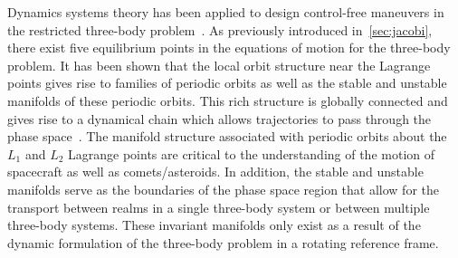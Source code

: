 \documentclass[preprint]{elsarticle}
\begin{document}
Dynamics systems theory has been applied to design control-free maneuvers in the restricted three-body problem~\cite{koon2011}.
As previously introduced in~\cref{sec:jacobi}, there exist five equilibrium points in the equations of motion for the three-body problem.
It has been shown that the local orbit structure near the Lagrange points gives rise to families of periodic orbits as well as the stable and unstable manifolds of these periodic orbits.
This rich structure is globally connected and gives rise to a dynamical chain which allows trajectories to pass through the phase space~\cite{koon2011,conley1968}.
The manifold structure associated with periodic orbits about the \( L_1 \) and \( L_2 \) Lagrange points are critical to the understanding of the motion of spacecraft as well as comets/asteroids.
In addition, the stable and unstable manifolds serve as the boundaries of the phase space region that allow for the transport between realms in a single three-body system or between multiple three-body systems.
These invariant manifolds only exist as a result of the dynamic formulation of the three-body problem in a rotating reference frame. 
\end{document}
